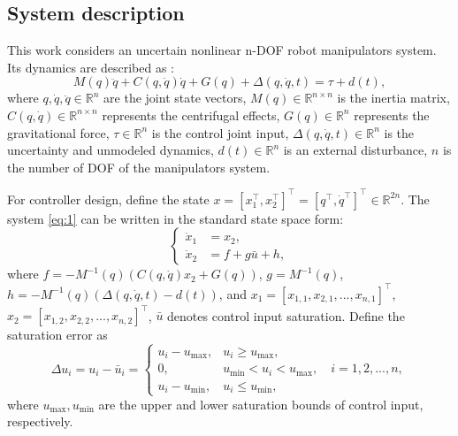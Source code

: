 \documentclass[pdflatex,sn-mathphys-num]{sn-jnl}%
\theoremstyle{thmstyleone}%
\theoremstyle{thmstyletwo}%
\theoremstyle{thmstylethree}%
\begin{document}
\subsection{System description}
\par This work considers an uncertain nonlinear n-DOF robot manipulators system. Its dynamics are described as \cite{SciaviccoSiciliano_2012_ModellingControl,BagheriEtAl_2019_Feedbacklinearization}:
\begin{equation}
	M(q)\ddot{q} + C(q, \dot{q})\dot{q} + G(q)+ \Delta(q, \dot{q}, t)= \tau + d(t),
	\label{eq:1}
\end{equation}
where $ q, \dot{q}, \ddot{q} \in \mathbb{R}^n $ are the joint state vectors, $M(q) \in \mathbb{R}^{n\times n}$ is the inertia matrix, $C(q, \dot{q}) \in \mathbb{R}^{n\times n} $ represents the centrifugal effects, $G(q) \in \mathbb{R}^n $ represents the gravitational force, $\tau \in \mathbb{R}^n$ is the control joint input, $\Delta(q, \dot{q}, t) \in \mathbb{R}^n$ is the uncertainty and unmodeled dynamics, $d(t) \in \mathbb{R}^n$ is an external disturbance, $n$ is the number of DOF of the manipulators system.

For controller design, define the state $x = [x_1^{\top},x_2^{\top}]^{\top} = [q^{\top},\dot{q}^{\top}]^{\top} \in \mathbb{R}^{2n}$. The system \cref{eq:1} can be written in the standard state space form:
\begin{equation}
	\left\{
	\begin{aligned}
		\dot{x}_1 & = x_2,     \\
		\dot{x}_2 & =f +g \bar{u} +h,
	\end{aligned}
	\right.
	\label{eq:2}
\end{equation}
where $f=-M^{-1}(q) (C(q,\dot{q})x_2 + G(q)) $, $g=M^{-1}(q)$, $h=-M^{-1}(q)(\Delta(q,\dot{q},t) - d(t))$, and $x_1=[x_{1,1},x_{2,1},...,x_{n,1}]^{\top}$, $x_2=[x_{1,2},x_{2,2},...,x_{n,2}]^{\top}$, $\bar{u}$ denotes control input saturation. Define the saturation error as
\begin{equation}\label{eq:3}
\Delta u_{i} =  u_{i}-\bar{u}_{i}=\begin{cases} 
	u_{i}-u_{\max}, & u_i \geq u_{\max}, \\
0,       & u_{\min} < u_i < u_{\max},  \quad i=1,2,...,n,\\
u_{i}-u_{\min}, & u_i \leq u_{\min},
\end{cases}
\end{equation}
where $u_{\max},u_{\min}$ are the upper and lower saturation bounds of control input, respectively.
\end{document}
